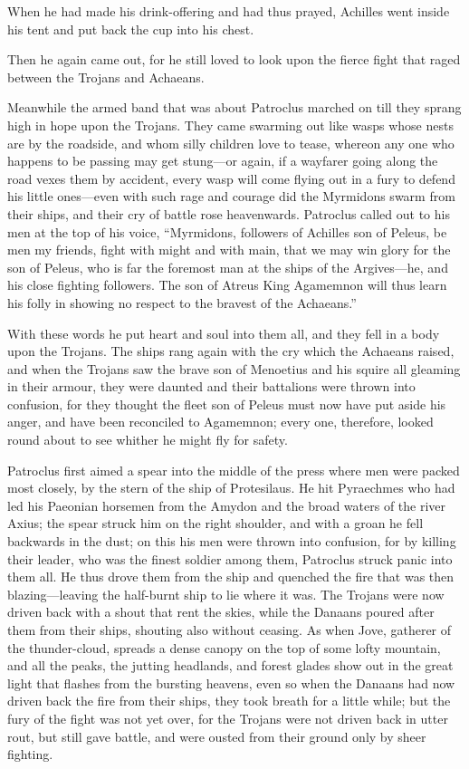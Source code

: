 When he had made his drink-offering and had thus prayed, Achilles went
inside his tent and put back the cup into his chest.

Then he again came out, for he still loved to look upon the fierce fight
that raged between the Trojans and Achaeans.

Meanwhile the armed band that was about Patroclus marched on till they
sprang high in hope upon the Trojans. They came swarming out like wasps
whose nests are by the roadside, and whom silly children love to tease,
whereon any one who happens to be passing may get stung—or again, if
a wayfarer going along the road vexes them by accident, every wasp will
come flying out in a fury to defend his little ones—even with such
rage and courage did the Myrmidons swarm from their ships, and their cry
of battle rose heavenwards. Patroclus called out to his men at the top of
his voice, “Myrmidons, followers of Achilles son of Peleus, be men my
friends, fight with might and with main, that we may win glory for the son
of Peleus, who is far the foremost man at the ships of the Argives—he,
and his close fighting followers. The son of Atreus King Agamemnon will
thus learn his folly in showing no respect to the bravest of the
Achaeans.”

With these words he put heart and soul into them all, and they fell in a
body upon the Trojans. The ships rang again with the cry which the
Achaeans raised, and when the Trojans saw the brave son of Menoetius and
his squire all gleaming in their armour, they were daunted and their
battalions were thrown into confusion, for they thought the fleet son of
Peleus must now have put aside his anger, and have been reconciled to
Agamemnon; every one, therefore, looked round about to see whither he
might fly for safety.

Patroclus first aimed a spear into the middle of the press where men were
packed most closely, by the stern of the ship of Protesilaus. He hit
Pyraechmes who had led his Paeonian horsemen from the Amydon and the broad
waters of the river Axius; the spear struck him on the right shoulder, and
with a groan he fell backwards in the dust; on this his men were thrown
into confusion, for by killing their leader, who was the finest soldier
among them, Patroclus struck panic into them all. He thus drove them from
the ship and quenched the fire that was then blazing—leaving the
half-burnt ship to lie where it was. The Trojans were now driven back with
a shout that rent the skies, while the Danaans poured after them from
their ships, shouting also without ceasing. As when Jove, gatherer of the
thunder-cloud, spreads a dense canopy on the top of some lofty mountain,
and all the peaks, the jutting headlands, and forest glades show out in
the great light that flashes from the bursting heavens, even so when the
Danaans had now driven back the fire from their ships, they took breath
for a little while; but the fury of the fight was not yet over, for the
Trojans were not driven back in utter rout, but still gave battle, and
were ousted from their ground only by sheer fighting.


